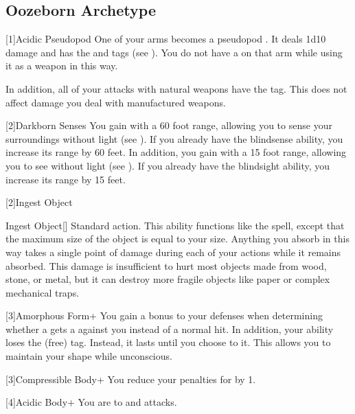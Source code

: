   \subsection{Oozeborn Archetype}

    [1]{Acidic Pseudopod} One of your arms becomes a pseudopod .
      It deals 1d10 damage and has the \atAcid and  tags (see ).
      You do not have a  on that arm while using it as a weapon in this way.

      In addition, all of your attacks with natural weapons have the \atAcid tag.
      This does not affect damage you deal with manufactured weapons.

    [2]{Darkborn Senses} You gain  with a 60 foot range, allowing you to sense your surroundings without light (see ).
      If you already have the blindsense ability, you increase its range by 60 feet.
      In addition, you gain  with a 15 foot range, allowing you to see without light (see ).
      If you already have the blindsight ability, you increase its range by 15 feet.

    [2]{Ingest Object}
      \begin{activeability}{Ingest Object}[\atAcid]
        \abilityusagetime Standard action.
        \rankline
        This ability functions like the  spell, except that the maximum size of the object is equal to your size.
        Anything you absorb in this way takes a single point of  damage during each of your actions while it remains absorbed.
        This damage is insufficient to hurt most objects made from wood, stone, or metal, but it can destroy more fragile objects like paper or complex mechanical traps.
      \end{activeability}

    [3]{Amorphous Form+} You gain a  bonus to your defenses when determining whether a  gets a  against you instead of a normal hit.
      In addition, your  ability loses the  (free) tag.
      Instead, it lasts until you choose to  it.
      This allows you to maintain your shape while unconscious.

    [3]{Compressible Body+} You reduce your penalties for \squeezing by 1.

    [4]{Acidic Body+} You are  to \atAcid and \atPoison attacks.

